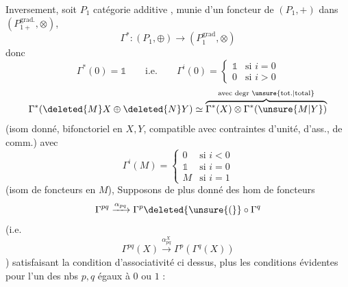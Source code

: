 Inversement, soit $P_1$  catégorie \inserted{$\otimes$}\unsure{-}additive ,
munie d'un  foncteur de $(P_1,+)$
dans $(P_{1+}^{\mathrm{grad.}},\otimes)$, 
\[
\Gamma^*:(P_1,\oplus)\longrightarrow(P_1^{\mathrm{grad}},\otimes)
\]
donc
\[
\Gamma^*(0)=\mathbb{1}\qquad\text{i.e.}\qquad
\Gamma^i(0)=\begin{cases}\mathbb{1}&\text{si }i=0\\0&\text{si }i>0\end{cases}
\]
\[
\Gamma^*(\deleted{M}X\oplus\deleted{N}Y)\simeq
\overbrace{\Gamma^*(X)\otimes\Gamma^*(\unsure{M|Y})}^{\text{avec degr \unsure{tot.|total}}}
\]
(isom  donné, bifonctoriel en $X,Y$, compatible
avec contraintes d'unité, d'ass., de comm.)
avec
\[
\Gamma^i(M)=\begin{cases}0&\text{si }i<0\\\mathbb{1}&\text{si }i=0\\M&\text{si }i=1\end{cases}
\]
(isom de foncteurs en $M$), Supposons de
plus donné des hom de foncteurs
\[
\Gamma^{pq}\xrightarrow{\alpha_{pq}}\Gamma^p\deleted{\unsure{(}}\circ\Gamma^q
\]
(i.e.
\[
\Gamma^{pq}(X)\xrightarrow{\alpha_{pq}^X}\Gamma^p(\Gamma^q(X))
\]
)
satisfaisant la condition d'associativité
ci dessus, plus les conditions
évidentes pour  l'un des nbs $p,q$
égaux à $0$ ou $1$ :
